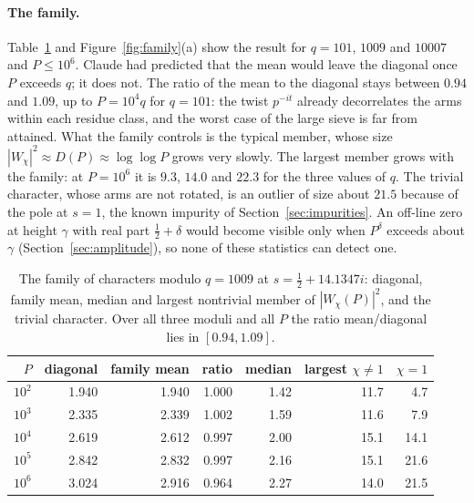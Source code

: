 \documentclass[11pt,a4paper]{article}
\theoremstyle{definition}\newtheorem{definition}[proposition]{Definition}
\theoremstyle{remark}\newtheorem{remark}[proposition]{Remark}
\begin{document}
\paragraph{The family.} Table~\ref{tab:family} and Figure~\ref{fig:family}(a) show the result for $q=101$, $1009$ and $10007$ and $P\le10^6$. Claude had predicted that the mean would leave the diagonal once $P$ exceeds $q$; it does not. The ratio of the mean to the diagonal stays between $0.94$ and $1.09$, up to $P=10^4q$ for $q=101$: the twist $p^{-it}$ already decorrelates the arms within each residue class, and the worst case of the large sieve is far from attained. What the family controls is the typical member, whose size $|W_\chi|^2\approx D(P)\approx\log\log P$ grows very slowly. The largest member grows with the family: at $P=10^6$ it is $9.3$, $14.0$ and $22.3$ for the three values of $q$. The trivial character, whose arms are not rotated, is an outlier of size about $21.5$ because of the pole at $s=1$, the known impurity of Section~\ref{sec:impurities}. An off-line zero at height $\gamma$ with real part $\tfrac12+\delta$ would become visible only when $P^\delta$ exceeds about $\gamma$ (Section~\ref{sec:amplitude}), so none of these statistics can detect one.

\begin{table}[ht]\centering\small
\caption{The family of characters modulo $q=1009$ at $s=\tfrac12+14.1347i$: diagonal, family mean, median and largest nontrivial member of $|W_\chi(P)|^2$, and the trivial character. Over all three moduli and all $P$ the ratio mean/diagonal lies in $[0.94,1.09]$.}\label{tab:family}
\begin{tabular}{rrrrrrr}
\toprule
$P$ & diagonal & family mean & ratio & median & largest $\chi\ne1$ & $\chi=1$\\
\midrule
$10^2$ & 1.940 & 1.940 & 1.000 & 1.42 & 11.7 & 4.7\\
$10^3$ & 2.335 & 2.339 & 1.002 & 1.59 & 11.6 & 7.9\\
$10^4$ & 2.619 & 2.612 & 0.997 & 2.00 & 15.1 & 14.1\\
$10^5$ & 2.842 & 2.832 & 0.997 & 2.16 & 15.1 & 21.6\\
$10^6$ & 3.024 & 2.916 & 0.964 & 2.27 & 14.0 & 21.5\\
\bottomrule
\end{tabular}
\end{table}
\end{document}
